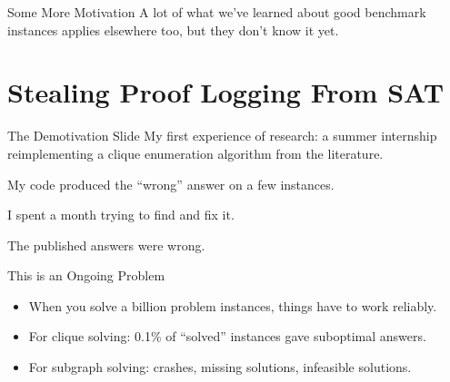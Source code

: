 \documentclass[aspectratio=169,compress,10pt]{beamer}
\begin{document}
\begin{frame}{Some More Motivation}
    A lot of what we've learned about good benchmark instances applies elsewhere too, but they don't know it yet.
\end{frame}

\section{Stealing Proof Logging From SAT}

\begin{frame}{The Demotivation Slide}
    My first experience of research: a summer internship reimplementing a clique enumeration algorithm from the literature.

    \bigskip

    My code produced the ``wrong'' answer on a few instances.

    \bigskip\pause

    I spent a month trying to find and fix it.

    \bigskip\pause

    The published answers were wrong.
\end{frame}

\begin{frame}{This is an Ongoing Problem}
    \begin{itemize}
        \item When you solve a billion problem instances, things have to work reliably.
        \item For clique solving: 0.1\% of ``solved'' instances gave suboptimal answers.
        \item For subgraph solving: crashes, missing solutions, infeasible solutions.
    \end{itemize}
\end{frame}
\end{document}
